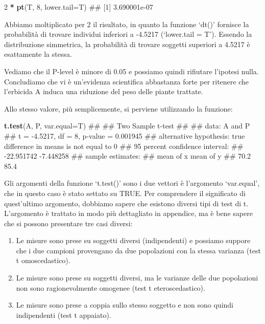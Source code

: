 \documentclass[a4paper,12pt,oneside]{book}
\providecommand{\tightlist}{%
  \setlength{\itemsep}{0pt}\setlength{\parskip}{0pt}}
\newenvironment{Shaded}{\begin{snugshade}}{\end{snugshade}}
\newcommand{\KeywordTok}[1]{\textcolor[rgb]{0.13,0.29,0.53}{\textbf{#1}}}
\newcommand{\DataTypeTok}[1]{\textcolor[rgb]{0.13,0.29,0.53}{#1}}
\newcommand{\DecValTok}[1]{\textcolor[rgb]{0.00,0.00,0.81}{#1}}
\newcommand{\StringTok}[1]{\textcolor[rgb]{0.31,0.60,0.02}{#1}}
\newcommand{\OperatorTok}[1]{\textcolor[rgb]{0.81,0.36,0.00}{\textbf{#1}}}
\newcommand{\NormalTok}[1]{#1}
\theoremstyle{definition}
\theoremstyle{definition}
\theoremstyle{definition}
\theoremstyle{remark}
\begin{document}
\begin{Shaded}
\begin{Highlighting}[]
\DecValTok{2} \OperatorTok{*}\StringTok{ }\KeywordTok{pt}\NormalTok{(T, }\DecValTok{8}\NormalTok{, }\DataTypeTok{lower.tail=}\NormalTok{T)}
\NormalTok{## [1] 3.690001e-07}
\end{Highlighting}
\end{Shaded}

Abbiamo moltiplicato per 2 il risultato, in quanto la funzione `dt()'
fornisce la probabilità di trovare individui inferiori a -4.5217
(`lower.tail = T'). Essendo la distribuzione simmetrica, la probabilità
di trovare soggetti superiori a 4.5217 è esattamente la stessa.

Vediamo che il P-level è minore di 0.05 e possiamo quindi rifiutare
l'ipotesi nulla. Concludiamo che vi è un'evidenza scientifica abbastanza
forte per ritenere che l'erbicida A induca una riduzione del peso delle
piante trattate.

Allo stesso valore, più semplicemente, si perviene utilizzando la
funzione:

\begin{Shaded}
\begin{Highlighting}[]
\KeywordTok{t.test}\NormalTok{(A, P, }\DataTypeTok{var.equal=}\NormalTok{T)}
\NormalTok{## }
\NormalTok{##  Two Sample t-test}
\NormalTok{## }
\NormalTok{## data:  A and P}
\NormalTok{## t = -4.5217, df = 8, p-value = 0.001945}
\NormalTok{## alternative hypothesis: true difference in means is not equal to 0}
\NormalTok{## 95 percent confidence interval:}
\NormalTok{##  -22.951742  -7.448258}
\NormalTok{## sample estimates:}
\NormalTok{## mean of x mean of y }
\NormalTok{##      70.2      85.4}
\end{Highlighting}
\end{Shaded}

Gli argomenti della funzione `t.test()' sono i due vettori è l'argomento
`var.equal', che in questo caso è stato settato su TRUE. Per comprendere
il significato di quest'ultimo argomento, dobbiamo sapere che esistono
diversi tipi di test di t. L'argomento è trattato in modo più
dettagliato in appendice, ma è bene sapere che si possono presentare tre
casi diversi:

\begin{enumerate}
\def\labelenumi{\arabic{enumi}.}
\tightlist
\item
  Le misure sono prese su soggetti diversi (indipendenti) e possiamo
  suppore che i due campioni provengano da due popolazioni con la stessa
  varianza (test t omoscedastico).
\item
  Le misure sono prese su soggetti diversi, ma le varianze delle due
  popolazioni non sono ragionevolmente omogenee (test t
  eteroscedastico).
\item
  Le misure sono prese a coppia sullo stesso soggetto e non sono quindi
  indipendenti (test t appaiato).
\end{enumerate}
\end{document}
